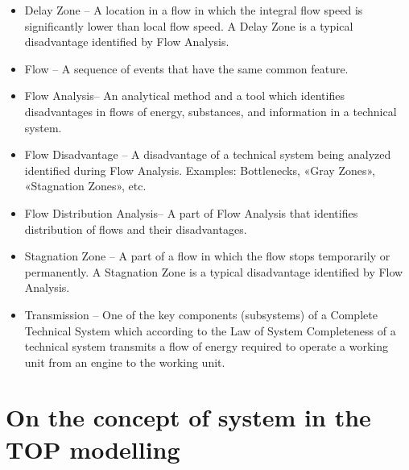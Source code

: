 \documentclass[11pt,a4paper]{article}
\begin{document}
\begin{itemize}[noitemsep]
\item Delay Zone -- A location in a flow in which the integral flow speed is
  significantly lower than local flow speed. A Delay Zone is a typical
  disadvantage identified by Flow Analysis. 
\item Flow -- A sequence of events that have the same common feature.
\item  Flow Analysis-- An analytical method and a tool which identifies
  disadvantages in flows of energy, substances, and information in a technical
  system.
\item  Flow Disadvantage -- A disadvantage of a technical system being
  analyzed identified during Flow Analysis. Examples: Bottlenecks, «Gray
  Zones», «Stagnation Zones», etc.
\item Flow Distribution Analysis-- A part of Flow Analysis that identifies
  distribution of flows and their disadvantages. 
\item Stagnation Zone -- A part of a flow in which the flow stops temporarily
  or permanently. A Stagnation Zone is a typical disadvantage identified by
  Flow Analysis.
\item Transmission -- One of the key components (subsystems) of a Complete
  Technical System which according to the Law of System Completeness of a
  technical system transmits a flow of energy required to operate a working
  unit from an engine to the working unit.
\end{itemize}

\section{On the concept of system in the TOP modelling}
\end{document}
